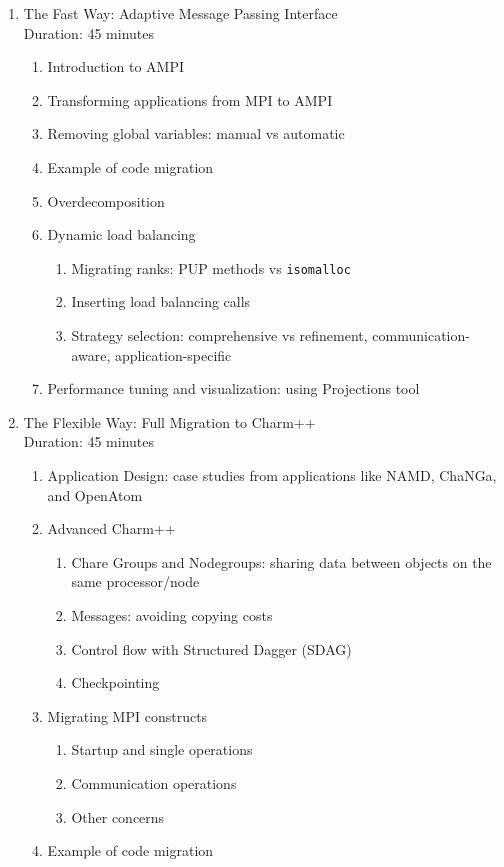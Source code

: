 \documentclass[letterpaper,10pt]{article}
\begin{document}
\begin{enumerate}
\item The Fast Way: Adaptive Message Passing Interface\\
\noindent Duration: 45 minutes
\begin{enumerate}
\item Introduction to AMPI
\item Transforming applications from MPI to AMPI
\item Removing global variables: manual vs automatic
\item Example of code migration
\item Overdecomposition
\item Dynamic load balancing
\begin{enumerate}
\item Migrating ranks: PUP methods vs {\tt isomalloc}
\item Inserting load balancing calls
\item Strategy selection: comprehensive vs refinement, communication-aware, application-specific
\end{enumerate}
\item Performance tuning and visualization: using Projections tool
\end{enumerate}
\item The Flexible Way: Full Migration to Charm++\\
\noindent Duration: 45 minutes
\begin{enumerate}
\item Application Design: case studies from applications like NAMD, ChaNGa, and OpenAtom
\item Advanced Charm++
\begin{enumerate}
\item Chare Groups and Nodegroups: sharing data between objects on the same processor/node
\item Messages: avoiding copying costs
\item Control flow with Structured Dagger (SDAG)
\item Checkpointing
\end{enumerate}
\item Migrating MPI constructs
\begin{enumerate}
\item Startup and single operations
\item Communication operations
\item Other concerns
\end{enumerate}
\item Example of code migration
\end{enumerate}

\end{enumerate}
\end{document}
